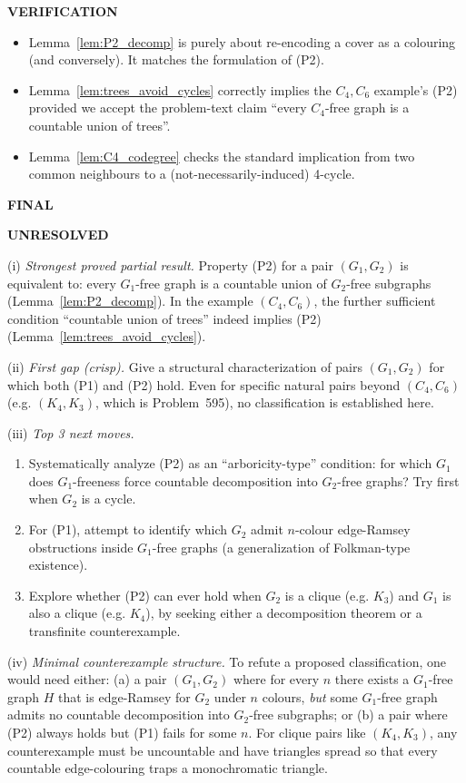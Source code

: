 \bigskip
\noindent\textbf{VERIFICATION}

\begin{itemize}
\item Lemma~\ref{lem:P2_decomp} is purely about re-encoding a cover as a colouring (and conversely). It matches the formulation of (P2).
\item Lemma~\ref{lem:trees_avoid_cycles} correctly implies the $C_4,C_6$ example's (P2) provided we accept the problem-text claim ``every $C_4$-free graph is a countable union of trees''.
\item Lemma~\ref{lem:C4_codegree} checks the standard implication from two common neighbours to a (not-necessarily-induced) 4-cycle.
\end{itemize}

\bigskip
\noindent\textbf{FINAL}

\textbf{UNRESOLVED}

(i) \emph{Strongest proved partial result.}
Property (P2) for a pair $(G_1,G_2)$ is equivalent to: every $G_1$-free graph is a countable union of $G_2$-free subgraphs (Lemma~\ref{lem:P2_decomp}).
In the example $(C_4,C_6)$, the further sufficient condition ``countable union of trees'' indeed implies (P2) (Lemma~\ref{lem:trees_avoid_cycles}).

(ii) \emph{First gap (crisp).}
Give a structural characterization of pairs $(G_1,G_2)$ for which both (P1) and (P2) hold.
Even for specific natural pairs beyond $(C_4,C_6)$ (e.g. $(K_4,K_3)$, which is Problem~595), no classification is established here.

(iii) \emph{Top 3 next moves.}
\begin{enumerate}
\item Systematically analyze (P2) as an ``arboricity-type'' condition: for which $G_1$ does $G_1$-freeness force countable decomposition into $G_2$-free graphs? Try first when $G_2$ is a cycle.
\item For (P1), attempt to identify which $G_2$ admit $n$-colour edge-Ramsey obstructions inside $G_1$-free graphs (a generalization of Folkman-type existence).
\item Explore whether (P2) can ever hold when $G_2$ is a clique (e.g. $K_3$) and $G_1$ is also a clique (e.g. $K_4$), by seeking either a decomposition theorem or a transfinite counterexample.
\end{enumerate}

(iv) \emph{Minimal counterexample structure.}
To refute a proposed classification, one would need either:
(a) a pair $(G_1,G_2)$ where for every $n$ there exists a $G_1$-free graph $H$ that is edge-Ramsey for $G_2$ under $n$ colours, \emph{but} some $G_1$-free graph admits no countable decomposition into $G_2$-free subgraphs; or
(b) a pair where (P2) always holds but (P1) fails for some $n$.
For clique pairs like $(K_4,K_3)$, any counterexample must be uncountable and have triangles spread so that every countable edge-colouring traps a monochromatic triangle.


